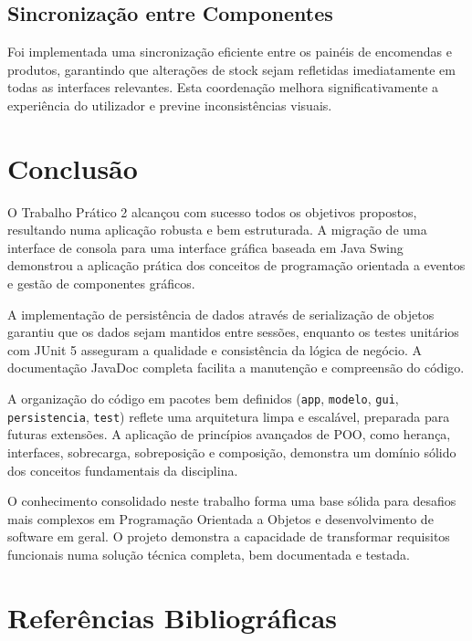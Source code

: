 \documentclass[a4paper,12pt]{article}
\begin{document}
\subsection{Sincronização entre Componentes}
Foi implementada uma sincronização eficiente entre os painéis de encomendas e produtos, garantindo que alterações de stock sejam refletidas imediatamente em todas as interfaces relevantes. Esta coordenação melhora significativamente a experiência do utilizador e previne inconsistências visuais.

\section{Conclusão}

O Trabalho Prático 2 alcançou com sucesso todos os objetivos propostos, resultando numa aplicação robusta e bem estruturada. A migração de uma interface de consola para uma interface gráfica baseada em Java Swing demonstrou a aplicação prática dos conceitos de programação orientada a eventos e gestão de componentes gráficos.

A implementação de persistência de dados através de serialização de objetos garantiu que os dados sejam mantidos entre sessões, enquanto os testes unitários com JUnit 5 asseguram a qualidade e consistência da lógica de negócio. A documentação JavaDoc completa facilita a manutenção e compreensão do código.

A organização do código em pacotes bem definidos (\texttt{app}, \texttt{modelo}, \texttt{gui}, \texttt{persistencia}, \texttt{test}) reflete uma arquitetura limpa e escalável, preparada para futuras extensões. A aplicação de princípios avançados de POO, como herança, interfaces, sobrecarga, sobreposição e composição, demonstra um domínio sólido dos conceitos fundamentais da disciplina.

O conhecimento consolidado neste trabalho forma uma base sólida para desafios mais complexos em Programação Orientada a Objetos e desenvolvimento de software em geral. O projeto demonstra a capacidade de transformar requisitos funcionais numa solução técnica completa, bem documentada e testada.

\clearpage

\newpage

\section{Referências Bibliográficas}
\end{document}
